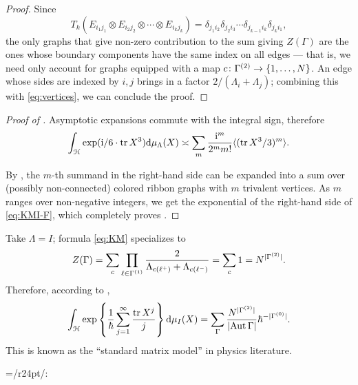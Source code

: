 \begin{proof}
  Since
  \begin{equation}\label{eq:vertices}
    T_k(E_{i_1j_1}\otimes E_{i_2j_2}\otimes\cdots\otimes
    E_{i_{k}j_k})=\delta_{j_1i_2}\delta_{j_2i_3}\cdots
    \delta_{j_{k-1}i_k}\delta_{j_ki_1},
  \end{equation}
  the only graphs that give non-zero contribution to the sum giving
  $Z(\Gamma)$ are the ones whose boundary components have the same index on
  all edges --- that is, we need only account for graphs equipped with
  a map $c\colon\Holes{\Gamma} \to \{1, \dots, N\}$.  An edge whose sides are
  indexed by $i,j$ brings in a factor $2/(\Lambda_i+\Lambda_j)$; combining this
  with \eqref{eq:vertices}, we can conclude the proof.
\end{proof}

\begin{proof}[Proof of ]
  Asymptotic expansions commute with the integral sign, therefore
  \begin{equation*}
    \int_{\Hn} \exp (\I/6 \cdot \tr X^3) \ud\mu_\Lambda(X) \asymp \sum_m
    \frac{\I^m}{2^mm!} \correlator{(\tr
      X^3/3)^m}. 
  \end{equation*}
  
  By , the $m$-th summand in the right-hand side
  can be expanded into a sum over (possibly non-connected) colored
  ribbon graphs with $m$ trivalent vertices. As $m$ ranges over
  non-negative integers, we get the exponential of the right-hand side
  of \eqref{eq:KMI-F}, which completely proves . 
\end{proof}

\begin{example}
  Take $\Lambda = I$; formula \eqref{eq:KM} specializes to 
  \begin{equation*}
    Z(\Gamma) = \sum_{c} \prod_{\ell\in \Edges{\Gamma}} \frac{2}{\Lambda_{c(\ell^+)} +
      \Lambda_{c(\ell^-)}}
    = \sum_c 1 = N^{\card{\Holes{\Gamma}}}. 
  \end{equation*}
  Therefore, according to ,
  \begin{equation}
    \int_{\Hermitian[N]} \exp \left\{ \frac{1}{\hbar}\sum_{j=1}^{\infty}
      \frac{\tr X^j}{j}
    \right\} \ud\mu_I(X) = 
    \sum_\Gamma \frac{N^{\card{\Holes{\Gamma}}}} {\card{\Aut
        \Gamma}}\hbar^{-\card{\Vertices{\Gamma}}}. 
  \end{equation}
  This is known as the ``standard matrix model'' in physics
  literature. 
\end{example}



\everyxy={/r24pt/:} %

